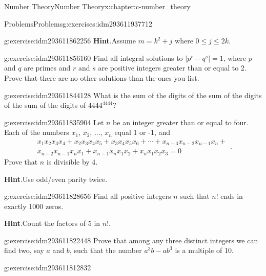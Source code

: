 \documentclass[twoside,10pt,]{book}
\newcommand{\blocktitlefont}{\relax}
\numberwithin{equation}{section}
\begin{document}
\begin{chapterptx}{Number Theory}{}{Number Theory}{}{}{x:chapter:c-number_theory}
\begin{exercises-section}{Problems}{}{Problems}{}{}{g:exercises:idm293611937712}
\begin{divisionexercise}{8}{}{}{g:exercise:idm293611862256}
\noindent\textbf{\blocktitlefont Hint}.\label{g:hint:idm293611859872}{}\hypertarget{g:hint:idm293611859872}{}\quad{}Assume \(m = k^2 + j\) where \(0 \leq j \leq 2k\).%
\end{divisionexercise}%
\begin{divisionexercise}{9}{}{}{g:exercise:idm293611856160}%
Find all integral solutions to \(\left|p^r-q^s\right|=1\), where \(p\) and \(q\) are primes and \(r\) and \(s\) are positive integers greater than or equal to 2. Prove that there are no other solutions than the ones you list.%
\end{divisionexercise}%
\begin{divisionexercise}{10}{}{}{g:exercise:idm293611844128}%
What is the sum of the digits of the sum of the digits of the sum of the digits of \(4444^{4444}\)?%
\end{divisionexercise}%
\begin{divisionexercise}{11}{}{}{g:exercise:idm293611835904}%
Let \(n\) be an integer greater than or equal to four.  Each of the numbers \(x_1\), \(x_2\), ..., \(x_n\) equal 1 or -1, and%
\begin{equation*}
\begin{split}
x_1x_2x_3x_4+x_2x_3x_4x_5+x_3x_4x_5x_6+\cdots+x_{n-3}x_{n-2}x_{n-1}x_n+\\
x_{n-2}x_{n-1}x_nx_1+x_{n-1}x_nx_1x_2+x_nx_1x_2x_3=0
\end{split}\text{.}
\end{equation*}
Prove that \(n\) is divisible by 4.%
\par\smallskip%
\noindent\textbf{\blocktitlefont Hint}.\label{g:hint:idm293611832192}{}\hypertarget{g:hint:idm293611832192}{}\quad{}Use odd\slash{}even parity twice.%
\end{divisionexercise}%
\begin{divisionexercise}{12}{}{}{g:exercise:idm293611828656}%
Find all positive integers \(n\) such that \(n!\) ends in exactly 1000 zeros.%
\par\smallskip%
\noindent\textbf{\blocktitlefont Hint}.\label{g:hint:idm293611823504}{}\hypertarget{g:hint:idm293611823504}{}\quad{}Count the factors of 5 in \(n!\).%
\end{divisionexercise}%
\begin{divisionexercise}{13}{}{}{g:exercise:idm293611822448}%
Prove that among any three distinct integers we can find two, say \(a\) and \(b\), such that the number \(a^3b - a b^3\) is a multiple of 10.%
\end{divisionexercise}%
\begin{divisionexercise}{14}{}{}{g:exercise:idm293611812832}%

\end{divisionexercise}
\end{exercises-section}
\end{chapterptx}
\end{document}
